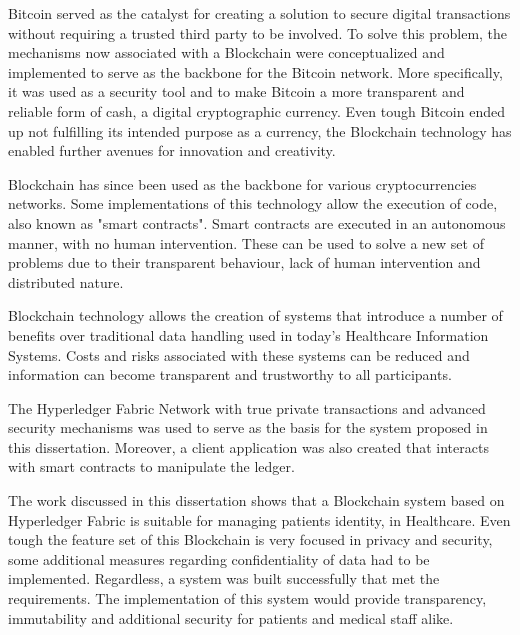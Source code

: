 \begin{tueABSTRACT}

  Bitcoin served as the catalyst for creating a solution to secure digital
  transactions without requiring a trusted third party to be involved. To solve
  this problem, the mechanisms now associated with a Blockchain were
  conceptualized and implemented to serve as the backbone for the Bitcoin
  network. More specifically, it was used as a security tool and to make
  Bitcoin a more transparent and reliable form of cash, a digital cryptographic
  currency. Even tough Bitcoin ended up not fulfilling its intended purpose as
  a currency, the Blockchain technology has enabled further avenues for
  innovation and creativity.

  Blockchain has since been used as the backbone for various cryptocurrencies
  networks. Some implementations of this technology allow the execution of
  code, also known as "smart contracts". Smart contracts are executed in an
  autonomous manner, with no human intervention. These can be used to solve a
  new set of problems due to their transparent behaviour, lack of human
  intervention and distributed nature. 

  Blockchain technology allows the creation of systems that introduce a number
  of benefits over traditional data handling used in today's Healthcare
  Information Systems. Costs and risks associated with these systems can be
  reduced and information can become transparent and trustworthy to all
  participants.
  
  The Hyperledger Fabric Network with true private transactions and advanced
  security mechanisms was used to serve as the basis for the system proposed in
  this dissertation. Moreover, a client application was also created that
  interacts with smart contracts to manipulate the ledger.
  
  The work discussed in this dissertation shows that a Blockchain system based
  on Hyperledger Fabric is suitable for managing patients identity, in
  Healthcare. Even tough the feature set of this Blockchain is very focused in
  privacy and security, some additional measures regarding confidentiality of
  data had to be implemented.  Regardless, a system was built successfully that
  met the requirements. The implementation of this system would provide
  transparency, immutability and additional security for patients and medical
  staff alike. 

\end{tueABSTRACT}
